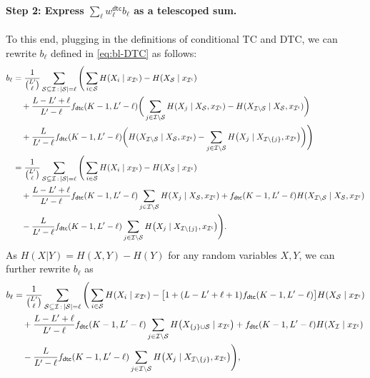 \documentclass[english]{article}
\newcommand{\cS}{\mathcal{S}}
\newcommand{\cI}{\mathcal{I}}
\newcommand{\dtc}{\mathsf{dtc}}
\begin{document}
\paragraph{Step 2: Express $\sum_{\ell} w^\dtc_{\ell} b_{\ell}$ as a telescoped sum.}
To this end, plugging in the definitions of conditional TC and DTC, we can rewrite $b_\ell$ defined in \eqref{eq:bl-DTC} as follows:
\begin{align*}
    b_{\ell} &= \frac{1}{\binom{L'}{\ell}}\sum_{\cS \subseteq \cI \,:\, |\cS|=\ell} \Bigg( \sum_{i \in \cS} H(X_i \mid x_{\cI^\mathsf{c}}) - H(X_{\cS} \mid x_{\cI^\mathsf{c}}) \notag \\
    &\quad + \frac{L-L'+\ell}{L'-\ell}f_\dtc(K-1, L'-\ell) \bigg( \sum_{j \in \cI \setminus \cS} H(X_j \mid X_{\cS}, x_{\cI^\mathsf{c}}) - H(X_{\cI \setminus \cS} \mid X_{\cS}, x_{\cI^\mathsf{c}}) \bigg) \notag \\
    &\quad + \frac{L}{L'-\ell}f_\dtc(K-1, L'-\ell) \bigg(H(X_{\cI \setminus \cS} \mid X_{\cS}, x_{\cI^\mathsf{c}}) - \sum_{j \in \cI \setminus \cS } H\big(X_j \mid X_{\cI \setminus \{j\}}, x_{\cI^\mathsf{c}}\big) \bigg) \Bigg)\notag \\
    &= \frac{1}{\binom{L'}{\ell}}\sum_{\cS \subseteq \cI \,:\, |\cS|=\ell} \Bigg( \sum_{i \in \cS} H(X_i \mid x_{\cI^\mathsf{c}}) - H(X_{\cS} \mid x_{\cI^\mathsf{c}}) \notag \\
    &\quad + \frac{L-L'+\ell}{L'-\ell}f_\dtc(K-1, L'-\ell) \sum_{j \in \cI \setminus \cS} H(X_j \mid X_{\cS}, x_{\cI^\mathsf{c}}) + f_\dtc(K-1, L'-\ell) H(X_{\cI \setminus \cS } \mid X_{\cS }, x_{\cI^\mathsf{c}}) \notag \\
    &\quad - \frac{L}{L'-\ell}f_\dtc(K-1, L'-\ell) \sum_{j \in \cI \setminus \cS } H\big(X_j \mid X_{\cI \setminus \{j\}}, x_{\cI^\mathsf{c}}\big)  \Bigg).
\end{align*}
As $H(X|Y) = H(X,Y) - H(Y)$ for any random variables $X,Y$, we can further rewrite $b_\ell$ as
\begin{align}
b_{\ell} &= \frac{1}{\binom{L'}{\ell}}\sum_{\cS \subseteq \cI \,:\, |\cS|=\ell} \Bigg( \sum_{i \in \cS} H(X_i \mid x_{\cI^\mathsf{c}}) - \big[1+ (L-L'+\ell+1)f_\dtc(K-1, L'-\ell) \big] H(X_{\cS} \mid x_{\cI^\mathsf{c}}) \notag \\
    &\quad + \frac{L-L'+\ell}{L'-\ell} f_\dtc(K-1, L'-\ell) \sum_{j \in \cI \setminus \cS} H\big(X_{\{j\} \cup \cS} \mid x_{\cI^\mathsf{c}}\big) + f_\dtc(K-1, L'-\ell)H(X_{\cI} \mid x_{\cI^\mathsf{c}}) \notag \\
    &\quad - \frac{L}{L'-\ell}f_\dtc(K-1, L'-\ell) \sum_{j \in \cI \setminus \cS } H\big(X_j \mid X_{\cI \setminus \{j\}}, x_{\cI^\mathsf{c}}\big)  \Bigg), \label{eq:bl-DTC-1}
\end{align}
\end{document}
